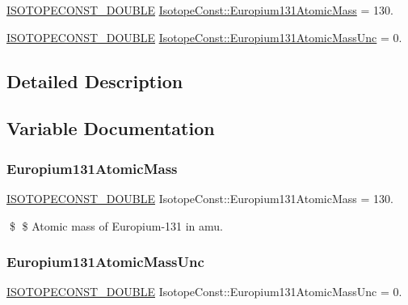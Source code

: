 \begin{DoxyCompactItemize}
\item 
\mbox{\hyperlink{group___isotope_const-_macros_ga8f45a7272ce02c0b4c65c44636ed719a}{I\+S\+O\+T\+O\+P\+E\+C\+O\+N\+S\+T\+\_\+\+D\+O\+U\+B\+LE}} \mbox{\hyperlink{group___isotope_const-_europium-_eu131_gab0d74b4b9eb52aedcf250357f251996d}{Isotope\+Const\+::\+Europium131\+Atomic\+Mass}} = 130.
\item 
\mbox{\hyperlink{group___isotope_const-_macros_ga8f45a7272ce02c0b4c65c44636ed719a}{I\+S\+O\+T\+O\+P\+E\+C\+O\+N\+S\+T\+\_\+\+D\+O\+U\+B\+LE}} \mbox{\hyperlink{group___isotope_const-_europium-_eu131_gaa90ee641a5058acd4646e99768b1be77}{Isotope\+Const\+::\+Europium131\+Atomic\+Mass\+Unc}} = 0.
\end{DoxyCompactItemize}


\subsection{Detailed Description}


\subsection{Variable Documentation}
\mbox{\label{group___isotope_const-_europium-_eu131_gab0d74b4b9eb52aedcf250357f251996d}} 
\subsubsection{\texorpdfstring{Europium131\+Atomic\+Mass}{Europium131AtomicMass}}
{\footnotesize\ttfamily \mbox{\hyperlink{group___isotope_const-_macros_ga8f45a7272ce02c0b4c65c44636ed719a}{I\+S\+O\+T\+O\+P\+E\+C\+O\+N\+S\+T\+\_\+\+D\+O\+U\+B\+LE}} Isotope\+Const\+::\+Europium131\+Atomic\+Mass = 130.}

\$ \$ Atomic mass of Europium-\/131 in amu. \mbox{\label{group___isotope_const-_europium-_eu131_gaa90ee641a5058acd4646e99768b1be77}} 
\subsubsection{\texorpdfstring{Europium131\+Atomic\+Mass\+Unc}{Europium131AtomicMassUnc}}
{\footnotesize\ttfamily \mbox{\hyperlink{group___isotope_const-_macros_ga8f45a7272ce02c0b4c65c44636ed719a}{I\+S\+O\+T\+O\+P\+E\+C\+O\+N\+S\+T\+\_\+\+D\+O\+U\+B\+LE}} Isotope\+Const\+::\+Europium131\+Atomic\+Mass\+Unc = 0.}


